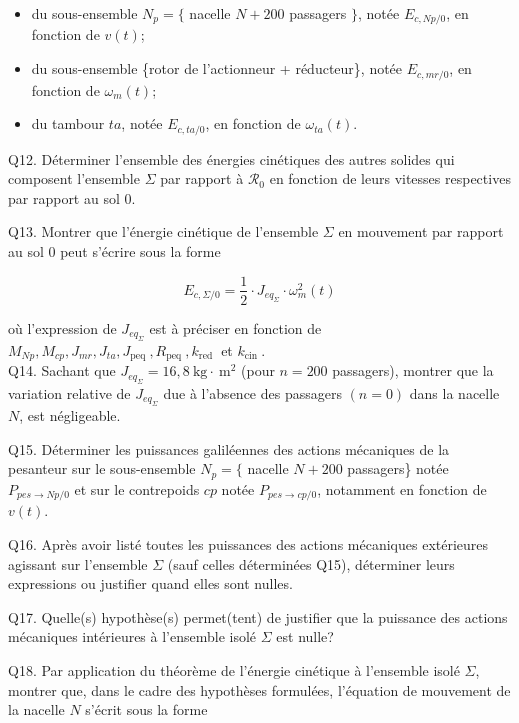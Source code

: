 \documentclass[10pt]{article}
\begin{document}
\begin{itemize}
  \item[-] du sous-ensemble $N_{p}=\{$ nacelle $N+200$ passagers $\}$, notée $E_{c, N p / 0}$, en fonction de $v(t)$;
  \item[-] du sous-ensemble \{rotor de l'actionneur + réducteur\}, notée $E_{c, m r / 0}$, en fonction de $\omega_{m}(t)$;
  \item[-] du tambour $t a$, notée $E_{c, t a / 0}$, en fonction de $\omega_{t a}(t)$.
\end{itemize}

Q12. Déterminer l'ensemble des énergies cinétiques des autres solides qui composent l'ensemble $\Sigma$ par rapport à $\mathcal{R}_{0}$ en fonction de leurs vitesses respectives par rapport au sol 0.

Q13. Montrer que l'énergie cinétique de l'ensemble $\Sigma$ en mouvement par rapport au sol 0 peut s'écrire sous la forme

$$
E_{c, \Sigma / 0}=\frac{1}{2} \cdot J_{e q_{\Sigma}} \cdot \omega_{m}^{2}(t)
$$

où l'expression de $J_{e q_{\Sigma}}$ est à préciser en fonction de $M_{N p}, M_{c p}, J_{m r}, J_{t a}, J_{\text {peq }}, R_{\text {peq }}, k_{\text {red }}$ et $k_{\text {cin }}$.\\
Q14. Sachant que $J_{e q_{\Sigma}}=16,8 \mathrm{~kg} \cdot \mathrm{~m}^{2}$ (pour $n=200$ passagers), montrer que la variation relative de $J_{e q_{\Sigma}}$ due à l'absence des passagers $(n=0)$ dans la nacelle $N$, est négligeable.

Q15. Déterminer les puissances galiléennes des actions mécaniques de la pesanteur sur le sous-ensemble $N_{p}=\{$ nacelle $N+200$ passagers\} notée $P_{p e s \rightarrow N p / 0}$ et sur le contrepoids $c p$ notée $P_{p e s \rightarrow c p / 0}$, notamment en fonction de $v(t)$.

Q16. Après avoir listé toutes les puissances des actions mécaniques extérieures agissant sur l'ensemble $\Sigma$ (sauf celles déterminées Q15), déterminer leurs expressions ou justifier quand elles sont nulles.

Q17. Quelle(s) hypothèse(s) permet(tent) de justifier que la puissance des actions mécaniques intérieures à l'ensemble isolé $\Sigma$ est nulle?

Q18. Par application du théorème de l'énergie cinétique à l'ensemble isolé $\Sigma$, montrer que, dans le cadre des hypothèses formulées, l'équation de mouvement de la nacelle $N$ s'écrit sous la forme
\end{document}
